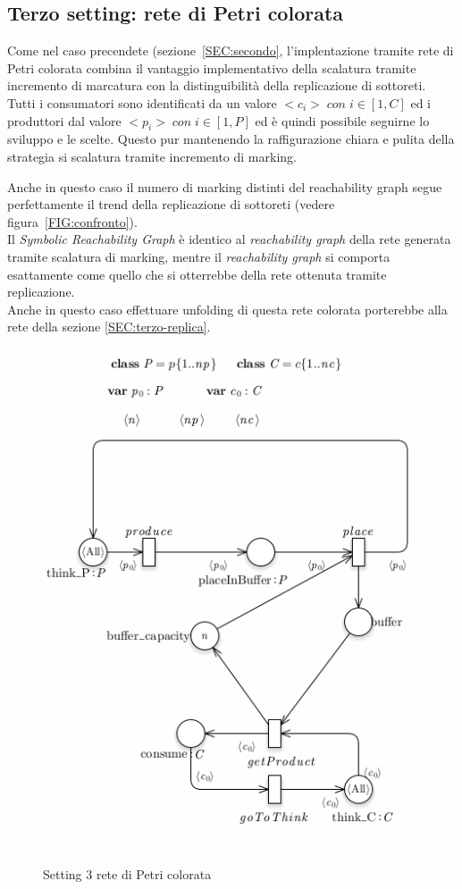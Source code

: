 \documentclass{article}
\begin{document}
\subsection{Terzo setting: rete di Petri colorata}
Come nel caso precendete (sezione~\ref{SEC:secondo}, l'implentazione tramite rete di Petri colorata combina il vantaggio implementativo della scalatura tramite incremento di marcatura con la distinguibilità della replicazione di sottoreti.\\
Tutti i consumatori sono identificati da un valore $<c_i> \; con \; i \in [1,C]$ ed i produttori dal valore $<p_i> \; con \; i \in [1,P]$ ed è quindi possibile seguirne lo sviluppo e le scelte.
Questo pur mantenendo la raffigurazione chiara e pulita della strategia si scalatura tramite incremento di marking.

Anche in questo caso il numero di marking distinti del reachability graph segue perfettamente il trend della replicazione di sottoreti (vedere figura~\ref{FIG:confronto}).\\
Il \textit{Symbolic Reachability Graph} è identico al \textit{reachability graph} della rete generata tramite scalatura di marking, mentre il \textit{reachability graph} si comporta esattamente come quello che si otterrebbe della rete ottenuta tramite replicazione.\\
Anche in questo caso effettuare unfolding di questa rete colorata porterebbe alla rete della sezione \ref{SEC:terzo-replica}.
\begin{figure}[!ht]
\centering
\centerline{\includegraphics[scale=0.5]{./Esercizio2_img/setting_3_CPN.png}}
\caption{Setting 3 rete di Petri colorata} \label{FIG:setting3_CPN}
\end{figure}\\
\end{document}

